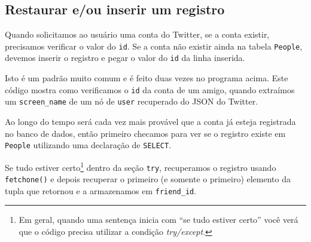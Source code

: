 \subsection{Restaurar e/ou inserir um registro}


Quando solicitamos ao usuário uma conta do Twitter, se a conta existir,
precisamos verificar o valor do {\tt id}. Se a conta não existir ainda
na tabela {\tt People}, devemos inserir o registro e pegar o valor do
{\tt id} da linha inserida.


Isto é um padrão muito comum e é feito duas vezes no programa acima. Este
código mostra como verificamos o {\tt id} da conta de um amigo, quando
extraímos um \verb"screen_name" de um nó de {\tt user} recuperado do JSON
do Twitter.


Ao longo do tempo será cada vez mais provável que a conta já esteja registrada
no banco de dados, então primeiro checamos para ver se o registro existe em
{\tt People} utilizando uma declaração de {\tt SELECT}.


Se tudo estiver certo\footnote{Em geral, quando uma sentença inicia com ``se
  tudo estiver certo'' você verá que o código precisa utilizar a condição
  {\it try/except}.} dentro da seção {\tt try}, recuperamos o registro usando
{\tt fetchone()} e depois recuperar o primeiro (e somente o primeiro) elemento
da tupla que retornou e a armazenamos em \verb"friend_id".


